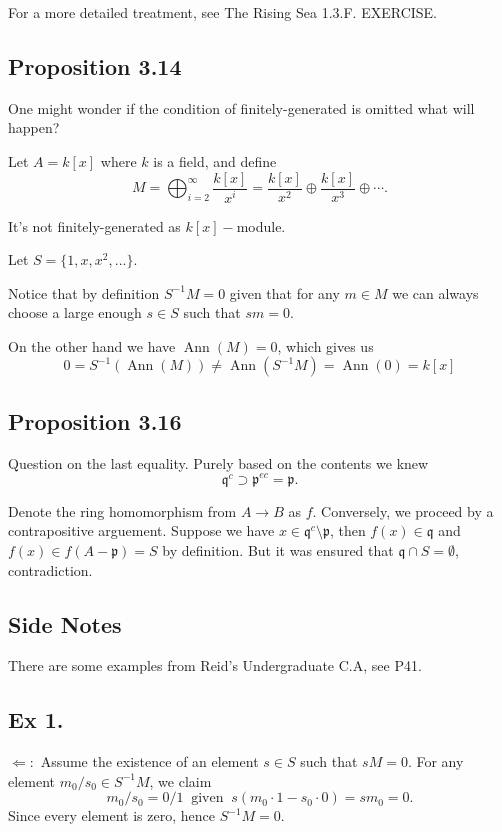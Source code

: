For a more detailed treatment, see The Rising Sea 1.3.F. EXERCISE.

\subsection{Proposition 3.14}

One might wonder if the condition of finitely-generated is omitted what will happen?

Let $A=k[x]$ where $k$ is a field, and define 
$$M=\bigoplus_{i=2}^{\infty}\frac{k[x]}{x^i}=\frac{k[x]}{x^2}\oplus \frac{k[x]}{x^3}\oplus\cdots.$$

It's not finitely-generated as $k[x]-$module. 

Let $S=\{1,x,x^2,...\}$.

Notice that by definition $S^{-1}M=0$ given that for any $m\in M$ we can always choose a large enough $s\in S$ such that $sm=0$.

On the other hand we have $\operatorname{Ann}(M)=0$, which gives us
$$0=S^{-1}(\operatorname{Ann}(M))\neq \operatorname{Ann}(S^{-1}M)=\operatorname{Ann}(0)=k[x]$$

\subsection{Proposition 3.16} 

Question on the last equality. Purely based on the contents we knew $$\mathfrak q^c \supset \mathfrak p^{ec}=\mathfrak p.$$

Denote the ring homomorphism from $A\to B$ as $f$.
Conversely, we proceed by a contrapositive arguement. Suppose we have $x\in \mathfrak q^c\setminus \mathfrak p$, then $f(x)\in \mathfrak q$ and $f(x)\in f(A-\mathfrak p)=S$ by definition. But it was ensured that $\mathfrak q\cap S=\emptyset$, contradiction.

\subsection{Side Notes}

There are some examples from Reid's Undergraduate C.A, see P41. 

\subsection{Ex 1.}\label{Atiyah Chapter 3 Ex 1.}

$\Leftarrow:$ Assume the existence of an element $s\in S$ such that $sM=0$. For any element $m_0/s_0\in S^{-1}M$, we claim 
$$m_0/s_0=0/1 ~\text{ given }~ s(m_0\cdot 1 - s_0\cdot 0)=sm_0=0.$$Since every element is zero, hence $S^{-1}M=0$. 

